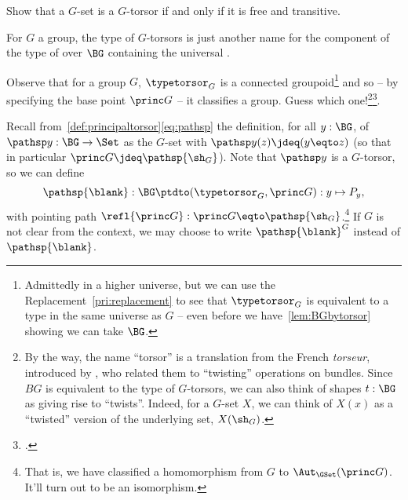 \begin{xca}\label{xca:torsor=free+transitive}
  Show that a $G$-set is a $G$-torsor if and only if it is free and transitive.
\end{xca}

\begin{remark}
  For $G$ a group, the type of $G$-torsors is just another name for the component of the type of \coverings over $\BG$ containing the universal \covering.

  Observe that for a group $G$, $\typetorsor_G$ is a connected groupoid\footnote{Admittedly in a higher universe, but we can use the
    Replacement~\cref{pri:replacement} to see that $\typetorsor_G$ is equivalent
    to a type in the same universe as $G$ -- even before we
    have~\cref{lem:BGbytorsor} showing we can take $\BG$.}
  and so -- by specifying the base point $\princ G$ -- it classifies a group.
  Guess which one!\footnote{%
    By the way, the name ``torsor'' is a translation from the French \emph{torseur},
    introduced by \citeauthor{giraud1971},\footnotemark{} who
    related them to “twisting” operations on bundles.
    Since $BG$ is equivalent to the type of $G$-torsors,
    we can also think of shapes $t:\BG$ as giving rise to “twists”.
    Indeed, for a $G$-set $X$,
    we can think of $X(x)$ as a ``twisted'' version of the underlying set,
    $X(\sh_G)$.}\footcitetext{giraud1971}.
\end{remark}


\begin{definition}
  \label{def:BG2TorsG}
Recall from~\cref{def:principaltorsor}\eqref{eq:pathsp}
the definition, for all $y:\BG$, of $\pathsp y:\BG\to\Set$
as the $G$-set with $\pathsp y(z)\jdeq(y\eqto z)$
(so that in particular $\princ G\jdeq\pathsp{\sh_G}$).
Note that $\pathsp y$ is a $G$-torsor, so we can define
  \[
    \pathsp{\blank}:\BG\ptdto(\typetorsor_G,\princ G): y\mapsto P_y,
  \]
  with pointing path $\refl{\princ G}:\princ G\eqto\pathsp{\sh_G}$.\footnote{%
    That is, we have classified a homomorphism from $G$
    to $\Aut_{\GSet}(\princ G)$. It'll turn out to be an isomorphism.}
If $G$ is not clear from the context, we may choose to write $\pathsp{\blank}^G$ instead of $\pathsp{\blank}$.
\end{definition}

